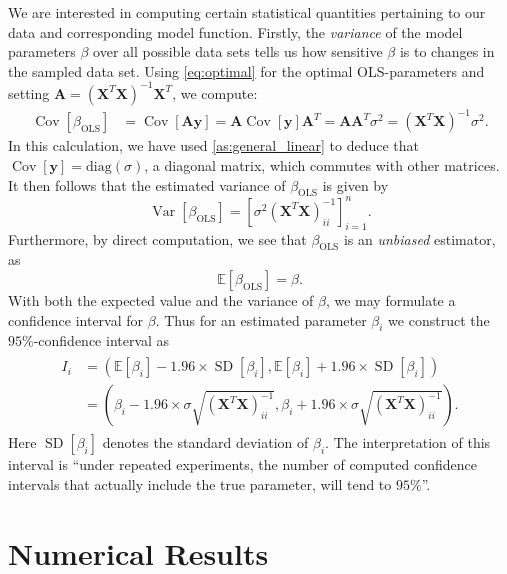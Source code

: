 \documentclass[dvipsnames, article, a4paper, oneside, 12pt]{memoir}
\newcommand{\X}{\bm{X}}
\newcommand{\diag}[1]{\mathrm{diag}(#1)}
\newcommand{\expect}{\mathbb{E}}
\DeclareMathOperator{\var}{Var}
\DeclareMathOperator{\cov}{Cov}
\newcommand{\OLS}{\mathrm{OLS}}
\DeclareMathOperator{\SD}{SD}
\newcommand{\mat}[1]{\bm{#1}}
\newcommand{\y}{\bm{y}}
\begin{document}
  We are interested in computing certain statistical quantities pertaining to
  our data and corresponding model function. Firstly, the \emph{variance} of
  the model parameters \( \beta \) over all possible data sets tells us how
  sensitive \( \beta \) is to changes in the sampled data set. Using
  \cref{eq:optimal} for the optimal OLS-parameters and setting \( \mat{A} =
  (\X^T\X)^{-1}\X^T\), we compute:
  \begin{align}
	  \label{eq:ols_variance}
	  \cov\left[\beta_{\OLS}\right] &= \cov\left[\mat{A}\y\right] = \mat{A} \cov\left[\y\right] \mat{A}^T = \mat{A}\mat{A}^T\sigma^2 = (\X^T{\X})^{-1} \sigma^2.
  \end{align}
  In this calculation, we have used \cref{as:general_linear} to deduce that \(
  \cov[ \y ] = \diag{\sigma}\), a diagonal matrix, which commutes with other
  matrices. It then follows that the estimated variance of \( \beta_{\OLS} \) is given by
  \begin{equation}
	  \var[\beta_{\OLS}] = [\sigma^2 (\X^T\X)^{-1}_{ii} ]_{i=1}^n.
  \end{equation}
  Furthermore, by direct computation, we see that \( \beta_{\OLS} \) is an \emph{unbiased} estimator,
  as 
  \begin{equation}
	  \expect[\beta_{\OLS}] = \beta.
  \end{equation}
  With both the expected value and the variance of \( \beta \), we may
  formulate a confidence interval for \( \beta \). Thus for an estimated
  parameter \( \beta_i \) we construct the
  \(95\%\)-confidence interval as
  \begin{align}
	  \begin{split}
		  I_i &= (\expect[\beta_i] - 1.96 \times \SD[\beta_i], \expect[\beta_i] + 1.96 \times \SD[\beta_i]) \\
		      &= \left(\beta_i - 1.96 \times \sigma \sqrt{(\X^T\X)^{-1}_{ii}}, \beta_i + 1.96 \times \sigma \sqrt{(\X^T\X)^{-1}_{ii}}\right).
	  \end{split}
  \end{align}
  Here \( \SD[\beta_i] \) denotes the standard deviation of \( \beta_i \).  The
  interpretation of this interval is  ``under repeated experiments, the number
  of computed confidence intervals that actually include the true parameter,
  will tend to \( 95\% \)''.
  



  \chapter{Numerical Results}
\end{document}
